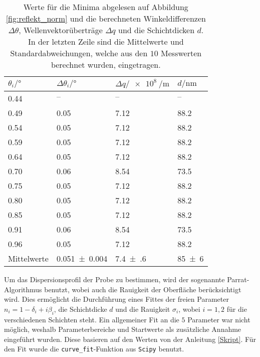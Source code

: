 \begin{table}
    \centering
    \begin{tabular}{@{}llll@{}}
    \toprule
     $\theta_i/ \si{\degree}$&$\Delta \theta_i / \si{\degree}$&$\Delta q / \SI{e8}{\per\metre} $&$d / \si{\nano\metre} $  \\ \midrule
     \num{0.44} &   $– $           &$– $   & $– $  \\
     \num{0.49} &\num{0.05 }   &\num{7.12}       & \num{88.2}  \\
     \num{0.54} &\num{0.05  }   &\num{7.12}      & \num{88.2} \\
     \num{0.59} &\num{0.05  }   &\num{7.12}      & \num{88.2} \\
     \num{0.64} &\num{0.05  }   &\num{7.12}      & \num{88.2} \\
     \num{0.70} &\num{0.06  }   &\num{8.54}      & \num{73.5} \\
     \num{0.75} &\num{0.05  }   &\num{7.12}      & \num{88.2} \\
     \num{0.80} &\num{0.05  }   &\num{7.12}      & \num{88.2} \\
     \num{0.85} &\num{0.05  }   &\num{7.12}      & \num{88.2} \\
     \num{0.91} &\num{0.06  }   &\num{8.54}      & \num{73.5} \\
     \num{0.96} &\num{0.05  }   &\num{7.12}      & \num{88.2} \\ \midrule
      Mittelwerte    &\num{0.051(4)} &\num{7.4(6)}  & \num{85(6)} \\ \bottomrule
    \end{tabular}
    \caption{Werte für die Minima abgelesen auf Abbildung \ref{fig:reflekt_norm} und die berechneten Winkeldifferenzen $\Delta \theta$, Wellenvektorüberträge $\Delta q$ und die Schichtdicken $d$. In der letzten Zeile sind die Mittelwerte und Standardabweichungen, welche aus den $10$ Messwerten berechnet wurden, eingetragen.}
    \label{tab:minima}
\end{table} 
Um das Dispersionsprofil der Probe zu bestimmen, wird der sogenannte Parrat-Algorithmus benutzt, wobei auch die Rauigkeit der Oberfläche berücksichtigt wird. 
Dies ermöglicht die Durchführung eines Fittes der freien Parameter $n_i = 1 -\delta_i +i\beta_i $, die Schichtdicke $d$ und die Rauigkeit $\sigma_i$, wobei $i = 1,2$ für die verschiedenen Schichten steht. 
Ein allgemeiner Fit an die $5$ Parameter war nicht möglich, weshalb Parameterbereiche und Startwerte als zusätzliche Annahme eingeführt wurden. Diese basieren auf den Werten von der Anleitung \ref{Skript}. Für den Fit wurde die \texttt{curve\_fit}-Funktion aus \texttt{Scipy} \cite{scipy} benutzt. 
